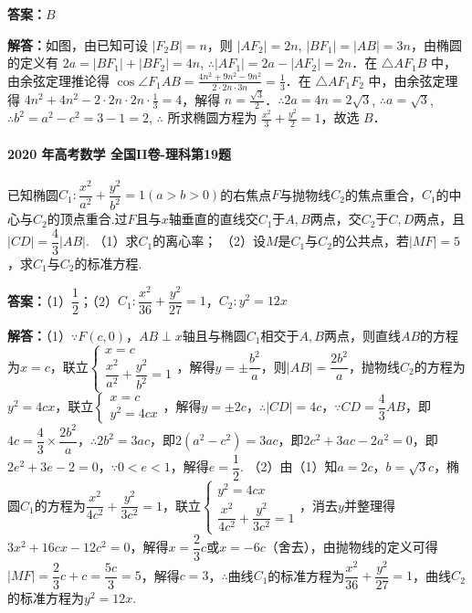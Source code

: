 \documentclass[UTF8,a4paper,11pt]{ctexart}
\begin{document}
\textbf{答案：}$B$\par

\textbf{解答：}如图，由已知可设 $|F_2B| = n$，则 $|AF_2| = 2n$, $|BF_1| = |AB| = 3n$，由椭圆的定义有 $2a = |BF_1| + |BF_2| = 4n$, $\therefore |AF_1| = 2a - |AF_2| = 2n$．在 $\triangle AF_1B$ 中，由余弦定理推论得 $\cos \angle F_1AB = \frac{4n^2 + 9n^2 - 9n^2}{2 \cdot 2n \cdot 3n} = \frac{1}{3}$．在 $\triangle AF_1F_2$ 中，由余弦定理得 $4n^2 + 4n^2 - 2 \cdot 2n \cdot 2n \cdot \frac{1}{3} = 4$，解得 $n = \frac{\sqrt{3}}{2}$．$\therefore 2a = 4n = 2\sqrt{3}$, $\therefore a = \sqrt{3}$, $\therefore b^2 = a^2 - c^2 = 3 - 1 = 2$, $\therefore$ 所求椭圆方程为 $\frac{x^2}{3} + \frac{y^2}{2} = 1$，故选 $B$．

\paragraph{2020 年高考数学 全国II卷-理科第19题}

已知椭圆$C_1:\dfrac{x^2}{a^2}+\dfrac{y^2}{b^2}=1(a>b>0)$的右焦点$F$与抛物线$C_2$的焦点重合，$C_1$的中心与$C_2$的顶点重合.过$F$且与$x$轴垂直的直线交$C_1$于$A,B$两点，交$C_2$于$C,D$两点，且$|CD|=\dfrac43|AB|$.
（1）求$C_1$的离心率；
（2）设$M$是$C_1$与$C_2$的公共点，若$|MF|=5$，求$C_1$与$C_2$的标准方程.

\textbf{答案：}（1）$\dfrac12$；（2）$C_1:\dfrac{x^2}{36}+\dfrac{y^2}{27}=1$，$C_2:y^2=12x$\par

\textbf{解答：}（1）$\because F(c,0)$，$AB\perp x$轴且与椭圆$C_1$相交于$A,B$两点，则直线$AB$的方程为$x=c$，联立$\begin{cases}x=c\\\dfrac{x^2}{a^2}+\dfrac{y^2}{b^2}=1\end{cases}$，解得$y=\pm\dfrac{b^2}{a}$，则$|AB|=\dfrac{2b^2}{a}$，抛物线$C_2$的方程为$y^2=4cx$，联立$\begin{cases}x=c\\y^2=4cx\end{cases}$，解得$y=\pm2c$，$\therefore |CD|=4c$，$\because CD=\dfrac43AB$，即$4c=\dfrac43\times\dfrac{2b^2}{a}$，$\therefore 2b^2=3ac$，即$2(a^2-c^2)=3ac$，即$2c^2+3ac-2a^2=0$，即$2e^2+3e-2=0$，$\because 0<e<1$，解得$e=\dfrac12$.
（2）由（1）知$a=2c$，$b=\sqrt3c$，椭圆$C_1$的方程为$\dfrac{x^2}{4c^2}+\dfrac{y^2}{3c^2}=1$，联立$\begin{cases}y^2=4cx\\\dfrac{x^2}{4c^2}+\dfrac{y^2}{3c^2}=1\end{cases}$，消去$y$并整理得$3x^2+16cx-12c^2=0$，解得$x=\dfrac23c$或$x=-6c$（舍去），由抛物线的定义可得$|MF|=\dfrac23c+c=\dfrac{5c}{3}=5$，解得$c=3$，$\therefore$曲线$C_1$的标准方程为$\dfrac{x^2}{36}+\dfrac{y^2}{27}=1$，曲线$C_2$的标准方程为$y^2=12x$.
\end{document}
